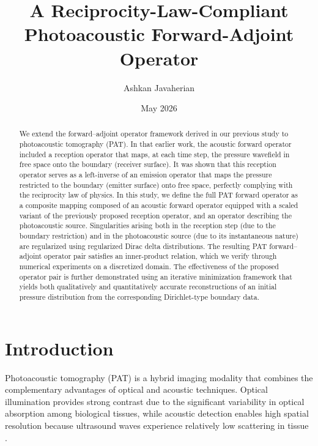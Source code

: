 \documentclass[11pt,reqno]{amsart}
\title[A Reciprocity-Law-Compliant Photoacoustic Forward-Adjoint Operator]{A Reciprocity-Law-Compliant Photoacoustic Forward-Adjoint Operator}
\author{Ashkan Javaherian}
\date{May 2026}
\theoremstyle{remark}
\begin{document}
 
\maketitle

\begin{abstract}
We extend the forward--adjoint operator framework derived in our previous study to photoacoustic tomography (PAT). In that earlier work, the acoustic forward operator included a reception operator that maps, at each time step, the pressure wavefield in free space onto the boundary (receiver surface). It was shown that this reception operator serves as a left-inverse of an emission operator that maps the pressure restricted to the boundary (emitter surface) onto free space, perfectly complying with the reciprocity law of physics. In this study, we define the full PAT forward operator as a composite mapping composed of an acoustic forward operator equipped with a scaled variant of the previously proposed reception operator, and an operator describing the photoacoustic source. Singularities arising both in the reception step (due to the boundary restriction) and in the photoacoustic source (due to its instantaneous nature) are regularized using regularized Dirac delta distributions. The resulting PAT forward--adjoint operator pair satisfies an inner-product relation, which we verify through numerical experiments on a discretized domain. The effectiveness of the proposed operator pair is further demonstrated using an iterative minimization framework that yields both qualitatively and quantitatively accurate reconstructions of an initial pressure distribution from the corresponding Dirichlet-type boundary data.
\end{abstract}




\section{Introduction}

Photoacoustic tomography (PAT) is a hybrid imaging modality that combines the complementary advantages of optical and acoustic techniques. Optical illumination provides strong contrast due to the significant variability in optical absorption among biological tissues, while acoustic detection enables high spatial resolution because ultrasound waves experience relatively low scattering in tissue \cite{Xu2006}. 
\end{document}
